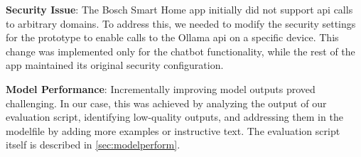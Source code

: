 \textbf{Security Issue}: The Bosch Smart Home app initially did not support \gls{api} calls to arbitrary domains. To address this, we needed to modify the security settings for the prototype to enable calls to the Ollama \gls{api} on a specific device. This change was implemented only for the chatbot functionality, while the rest of the app maintained its original security configuration.

\textbf{Model Performance}: Incrementally improving model outputs proved challenging. In our case, this was achieved by analyzing the output of our evaluation script, identifying low-quality outputs, and addressing them in the modelfile by adding more examples or instructive text. The evaluation script itself is described in \cref{sec:modelperform}.
